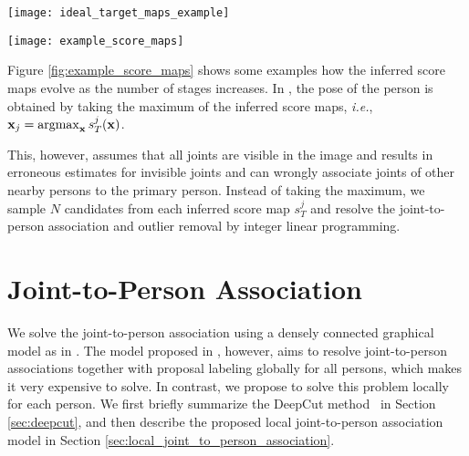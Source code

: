\documentclass[runningheads]{llncs}
\newcommand{\ie}{\mbox{\emph{i.e.}}}
\DeclareMathOperator*{\argmax}{argmax}
\begin{document}
\begin{figure*}[t!]
\centering
\captionsetup[figure]{skip=0pt}
\texttt{[image: ideal\_target\_maps\_example]}
\caption{Example of target score maps for the head, neck and left shoulder. The target score maps for the first stage include the joints of all persons (left). The target score maps for all subsequent stages only include the joints of the primary person.}
\label{fig:ideal_target_maps_example}
\end{figure*}


\begin{figure*}[t!]
\centering
\captionsetup[figure]{skip=0pt}
\texttt{[image: example\_score\_maps]}
\caption{Examples of score maps provided by different stages of the CPM. The first stage of CPM uses only local image evidence and therefore provides high confidence scores for the joints of all persons in the image. Whereas all subsequent stages are trained to provide high confidence scores only for the joints of the primary person while suppressing the joints of other persons. The primary person is highlighted by a yellow dot in the first row. (best viewed in color)}
\label{fig:example_score_maps}
\end{figure*}


Figure \ref{fig:example_score_maps} shows some examples how the inferred score maps evolve as the number of stages increases. In \cite{wei2016convolutional}, the pose of the person is obtained by taking the maximum of the inferred score maps, \ie, $\bold{x}_{j} = \argmax_{\bold{x}} s^j_{T}(\bold{x})$.

This, however, assumes that all joints are visible in the image and results in erroneous estimates for invisible joints and can wrongly associate joints of other nearby persons to the primary person. Instead of taking the maximum, we sample $N$ candidates from each inferred score map $s^j_{T}$ and resolve the joint-to-person association and outlier removal by integer linear programming.   

\section{Joint-to-Person Association}\label{sec:jtop}
We solve the joint-to-person association using a densely connected graphical model as in \cite{pishchulin2015deepcut}. The model proposed in \cite{pishchulin2015deepcut}, however, aims to resolve joint-to-person associations together with proposal labeling globally for all persons, which makes it very expensive to solve. In contrast, we propose to solve this problem locally for each person. We first briefly summarize the DeepCut method~\cite{pishchulin2015deepcut} in Section \ref{sec:deepcut}, and then describe the proposed local joint-to-person association model in Section \ref{sec:local_joint_to_person_association}. 
\end{document}
